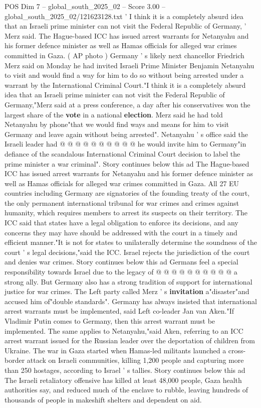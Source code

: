 \begin{textsample}{POS Dim 7 – global\_south\_2025\_02 – Score 3.00 – global\_south\_2025\_02/121623128.txt}  \label{ex:f7_pos_425}
' I think it is a completely absurd idea that an Israeli prime minister can not visit the Federal Republic of Germany, ' Merz said.
The Hague-based ICC has issued arrest warrants for Netanyahu and his former defence minister as well as Hamas officials for alleged war crimes committed in Gaza. ( AP photo ) Germany ' s likely next chancellor Friedrich Merz said on Monday he had invited Israeli Prime Minister Benjamin Netanyahu to visit and would find a way for him to do so without being arrested under a warrant by the International Criminal Court."I think it is a completely absurd idea that an Israeli prime minister can not visit the Federal Republic of Germany,"Merz said at a press conference, a day after his conservatives won the largest share of the \textbf{vote} in a national \textbf{election}.
Merz said he had told Netanyahu by phone"that we would find ways and means for him to visit Germany and leave again without being arrested".
Netanyahu ' s office said the Israeli leader had @ @ @ @ @ @ @ @ @ @ he would invite him to Germany"in defiance of the scandalous International Criminal Court decision to label the prime minister a war criminal".
Story continues below this ad The Hague-based ICC has issued arrest warrants for Netanyahu and his former defence minister as well as Hamas officials for alleged war crimes committed in Gaza.
All 27 EU countries including Germany are signatories of the founding treaty of the court, the only permanent international tribunal for war crimes and crimes against humanity, which requires members to arrest its suspects on their territory.
The ICC said that states have a legal obligation to enforce its decisions, and any concerns they may have should be addressed with the court in a timely and efficient manner."It is not for states to unilaterally determine the soundness of the court ' s legal decisions,"said the ICC.
Israel rejects the jurisdiction of the court and denies war crimes.
Story continues below this ad Germans feel a special responsibility towards Israel due to the legacy of @ @ @ @ @ @ @ @ @ @ a strong ally.
But Germany also has a strong tradition of support for international justice for war crimes.
The Left party called Merz ' s \textbf{invitation} a"disaster"and accused him of"double standards".
Germany has always insisted that international arrest warrants must be implemented, said Left co-leader Jan van Aken."If Vladimir Putin comes to Germany, then this arrest warrant must be implemented.
The same applies to Netanyahu,"said Aken, referring to an ICC arrest warrant issued for the Russian leader over the deportation of children from Ukraine.
The war in Gaza started when Hamas-led militants launched a cross-border attack on Israeli communities, killing 1,200 people and capturing more than 250 hostages, according to Israel ' s tallies.
Story continues below this ad The Israeli retaliatory offensive has killed at least 48,000 people, Gaza health authorities say, and reduced much of the enclave to rubble, leaving hundreds of thousands of people in makeshift shelters and dependent on aid.

\end{textsample}
